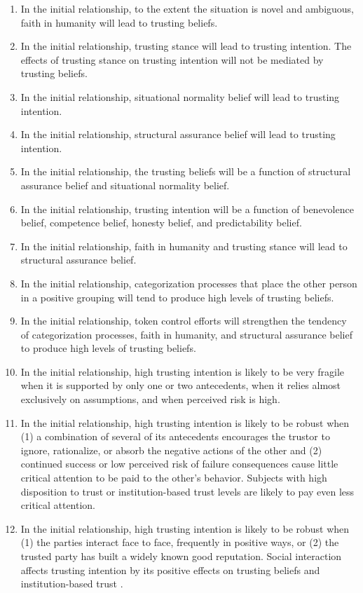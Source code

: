 \documentclass{sigchi}
\begin{document}
\begin{enumerate}
\item In the initial relationship, to the extent the situation is novel and ambiguous, faith in humanity will lead to trusting beliefs.
\item In the initial relationship, trusting stance will lead to trusting intention. The effects of trusting stance on trusting intention will not be mediated by trusting beliefs.
\item In the initial relationship, situational normality belief will lead to trusting intention.
\item In the initial relationship, structural assurance belief will lead to trusting intention.
\item In the initial relationship, the trusting beliefs will be a function of structural assurance belief and situational normality belief.
\item In the initial relationship, trusting intention will be a function of benevolence belief, competence belief, honesty belief, and predictability belief.
\item In the initial relationship, faith in humanity and trusting stance will lead to structural assurance belief.
\item In the initial relationship, categorization processes that place the other person in a positive grouping will tend to produce high levels of trusting beliefs.
\item In the initial relationship, token control efforts will strengthen the tendency of categorization processes, faith in humanity, and structural assurance belief to produce high levels of trusting beliefs.
\item In the initial relationship, high trusting intention is likely to be very fragile when it is supported
by only one or two antecedents, when it relies almost exclusively on assumptions, and when perceived risk is high.
\item In the initial relationship, high trusting intention is likely to be robust when (1) a combination of several of its antecedents encourages the trustor to ignore, rationalize, or absorb the negative actions of the other and (2) continued success or low perceived risk of failure consequences cause little critical attention to be paid to the other's behavior. Subjects with high disposition to trust or institution-based trust levels are likely to pay even less critical attention.
\item In the initial relationship, high trusting intention is likely to be robust when (1) the parties interact face to face, frequently in positive ways, or (2) the trusted party has built a widely known good reputation. Social interaction affects trusting intention by its positive effects on trusting beliefs and institution-based trust
\cite{mcknight1998initial}.
\end{enumerate}







\printbibliography
\end{document}
